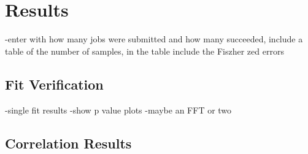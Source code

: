 
\graphicspath{{Body/Figures/}}

\section{Results}


-enter with how many jobs were submitted and how many succeeded, include a table of the number of samples, in the table include the Fiszher zed errors





\subsection{Fit Verification}


-single fit results
-show p value plots
-maybe an FFT or two



\subsection{Correlation Results}
